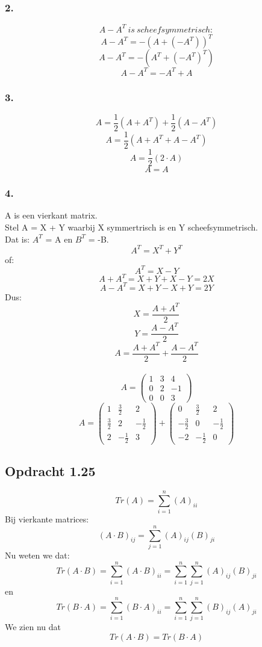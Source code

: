 \documentclass[lineaire_algebra_oplossingen.tex]{subfiles}
\begin{document}
\subsubsection*{2.}
$$A - A^T \ is \ scheefsymmetrisch:$$
$$A - A^T = -(A+(-A^T))^T$$
$$A - A^T = -(A^T + (-A^T)^T)$$
$$A - A^T = -A^T + A$$
\subsubsection*{3.}
$$ A =  \frac{1}{2}(A + A^T) + \frac{1}{2}(A - A^T)$$
$$ A = \frac{1}{2}(A + A^T + A - A^T)$$
$$ A = \frac{1}{2}(2\cdot A)$$
$$ A = A$$
\subsubsection*{4.}
A is een vierkant matrix.\\
Stel A = X + Y waarbij X symmertrisch is en Y scheefsymmetrisch.\\
Dat is: $A^T$ = A en $B^T$ = -B.\\
$$A^T = X^T + Y^T$$
of: $$A^T = X - Y$$
$$A + A^T = X + Y + X - Y = 2X$$
$$A - A^T = X + Y - X + Y = 2Y$$
Dus:
$$X = \frac{A + A^T}{2}$$
$$Y = \frac{A - A^T}{2}$$
$$A = \frac{A + A^T}{2} + \frac{A - A^T}{2}$$
\\
$$
A = \begin{pmatrix}
1 & 3 & 4\\
0 & 2 & -1\\
0 & 0 & 3
\end{pmatrix}
$$
$$
A = \begin{pmatrix}
1 & \frac{3}{2} & 2\\
\frac{3}{2} & 2 & -\frac{1}{2}\\
2 & -\frac{1}{2} & 3
\end{pmatrix}
+
\begin{pmatrix}
0 & \frac{3}{2} & 2\\
-\frac{3}{2} & 0 & -\frac{1}{2}\\
-2 & -\frac{1}{2} & 0
\end{pmatrix}
$$
\subsection{Opdracht 1.25}
\[
Tr(A) = \sum^{n}_{i=1}(A)_{ii}
\]
Bij vierkante matrices:
\[
(A\cdot B)_{ij} = \sum^{n}_{j=1}(A)_{ij}(B)_{ji}
\]
Nu weten we dat:
\[
Tr(A\cdot B) =\sum^{n}_{i=1}(A\cdot B)_{ii}=\sum^{n}_{i=1}\sum^{n}_{j=1}(A)_{ij}(B)_{ji}
\]
en
\[
Tr(B\cdot A) =\sum^{n}_{i=1}(B\cdot A)_{ii}=\sum^{n}_{i=1}\sum^{n}_{j=1}(B)_{ij}(A)_{ji}
\]
We zien nu dat
\[
Tr(A\cdot B) = Tr(B\cdot A)
\]
\end{document}
